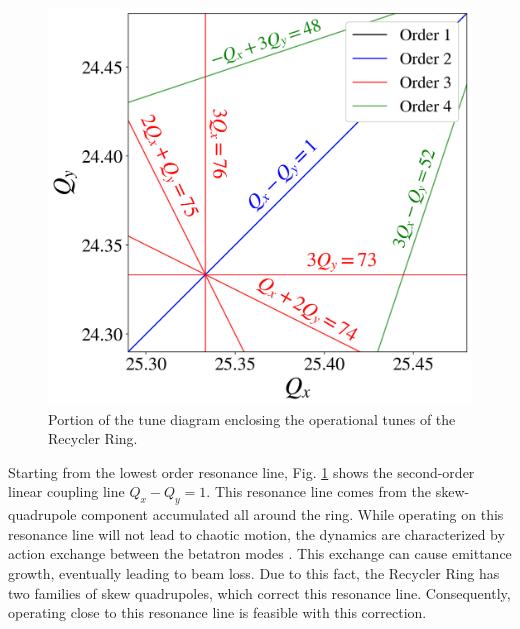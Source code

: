 \begin{figure}[H]
   \centering
   \includegraphics[width=\columnwidth]{chapter3/rrtd.png}
   \caption{Portion of the tune diagram enclosing the operational tunes of the Recycler Ring.}
   \label{fig:rrtd}
   \vspace{-1.25em}
\end{figure}

Starting from the lowest order resonance line, Fig. \ref{fig:rrtd} shows the second-order linear coupling line $Q_x-Q_y = 1$. This resonance line comes from the skew-quadrupole component accumulated all around the ring. While operating on this resonance line will not lead to chaotic motion, the dynamics are characterized by action exchange between the betatron modes \cite{sylee}. This exchange can cause emittance growth, eventually leading to beam loss. Due to this fact, the Recycler Ring has two families of skew quadrupoles, which correct this resonance line. Consequently, operating close to this resonance line is feasible with this correction.

